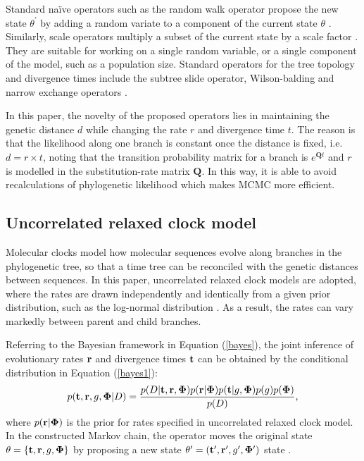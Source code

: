 \documentclass{bmcart}
\begin{document}
Standard na\"{i}ve operators such as the random walk operator propose the new state $\theta^\prime$ by adding a random variate to a component of the current state $\theta$ \cite{suchard2005stochastic}. Similarly, scale operators multiply a subset of the current state by a scale factor \cite{higuchi1997monte}. They are suitable for working on a single random variable, or a single component of the model, such as a population size. Standard operators for the tree topology and divergence times include the subtree slide operator, Wilson-balding and narrow exchange operators \cite{drummond2002estimatingdata,hohna2008clock}.

In this paper, the novelty of the proposed operators lies in maintaining the genetic distance $d$ while changing the rate $r$ and divergence time $t$. The reason is that the likelihood along one branch is constant once the distance is fixed, i.e. $d = r \times t$, noting that the transition probability matrix for a branch is ${e^{\textbf{Q}t}}$ and $r$ is modelled in the substitution-rate matrix $\textbf{Q}$. In this way, it is able to avoid recalculations of phylogenetic likelihood which makes MCMC more efficient. 

\subsection*{Uncorrelated relaxed clock model}
Molecular clocks model how molecular sequences evolve along branches in the phylogenetic tree, so that a time tree can be reconciled with the genetic distances between sequences. In this paper, uncorrelated relaxed clock models are adopted, where the rates are drawn independently and identically from a given prior distribution, such as the log-normal distribution \cite{drummond2006relaxed}. As a result, the rates can vary markedly between parent and child branches.

Referring to the Bayesian framework in Equation (\ref{bayes}), the joint inference of evolutionary rates ${\bf{r}}$ and divergence times ${\bf{t}}$ can be obtained by the conditional distribution in Equation (\ref{bayes1}):
\begin{equation}\label{bayes1}
p({\bf{t}},{\bf{r}},g,{\bf{\Phi}} |D) = \frac{{p(D|{\bf{t}},{\bf{r}},{\bf{\Phi}} )p({\bf{r}}|{\bf{\Phi}} )p({\bf{t}}|g,{\bf{\Phi}} )p(g)p({\bf{\Phi}} )}}{{p(D)}} \text{,}
\end{equation}
where $p({\bf{r}}|{\bf{\Phi}} )$ is the prior for rates specified in uncorrelated relaxed clock model. In the constructed Markov chain, the operator moves the original state $\theta =  \{ {\bf{t}},{\bf{r}},g,{\bf{\Phi}}\}$ by proposing a new state ${\theta^\prime} = ({\bf{t}^\prime},{\bf{r}^\prime},g^\prime,{\bf{\Phi}^\prime})$ state  .
\end{document}

